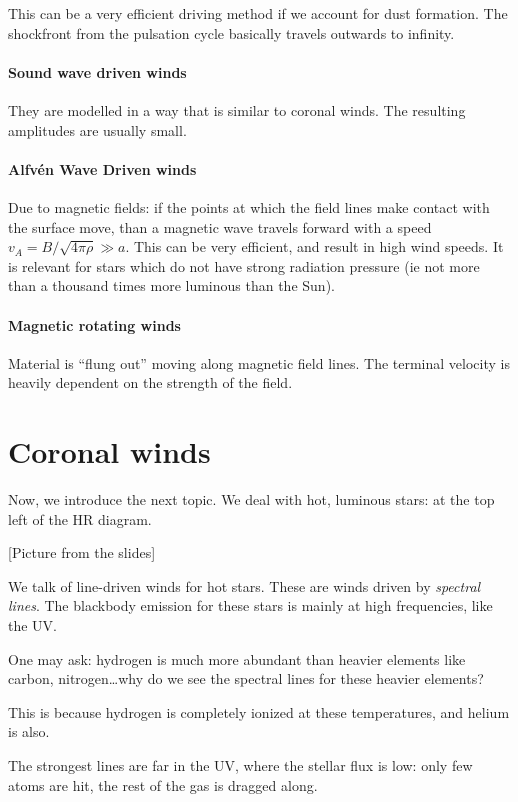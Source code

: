 \documentclass[main.tex]{subfiles}
\begin{document}
This can be a very efficient driving method if we account for dust formation. The shockfront from the pulsation cycle basically travels outwards to infinity.

\paragraph{Sound wave driven winds}
They are modelled in a way that is similar to coronal winds. 
The resulting amplitudes are usually small. 

\paragraph{Alfvén Wave Driven winds}
Due to magnetic fields: if the points at which the field lines make contact with the surface move, than a magnetic wave travels forward with a speed \(v_A = B / \sqrt{4 \pi \rho } \gg a\). 
This can be very efficient, and result in high wind speeds. 
It is relevant for stars which do not have strong radiation pressure (ie not more than a thousand times more luminous than the Sun). 

\paragraph{Magnetic rotating winds}
Material is ``flung out'' moving along magnetic field lines. 
The terminal velocity is heavily dependent on the strength of the field.

\section{Coronal winds}

Now, we introduce the next topic.
We deal with hot, luminous stars: at the top left of the HR diagram.

[Picture from the slides]

We talk of line-driven winds for hot stars.
These are winds driven by \emph{spectral lines}. 
The blackbody emission for these stars is mainly at high frequencies, like the UV.

One may ask: hydrogen is much more abundant than heavier elements like carbon, nitrogen\dots why do we see the spectral lines for these heavier elements?

This is because hydrogen is completely ionized at these temperatures, and helium is also.

The strongest lines are far in the UV, where the stellar flux is low: only few atoms are hit, the rest of the gas is dragged along.
\end{document}
